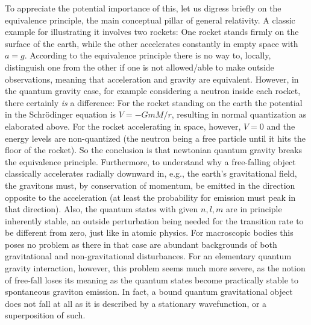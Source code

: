 	To appreciate the potential importance of this, let us digress
	briefly on the equivalence principle, the main conceptual pillar
	of general relativity. A classic example for illustrating it
	involves two rockets: One rocket stands firmly on the surface of
	the earth, while the other accelerates constantly in empty space
	with $a = g$. According to the equivalence principle there is no
	way to, locally, distinguish one from the other if one is not
	allowed/able to make outside observations, meaning that
	acceleration and gravity are equivalent. However, in the quantum
	gravity case, for example considering a neutron inside each
	rocket, there certainly \textit{is} a difference: For the rocket
	standing on the earth the potential in the Schr\"{o}dinger
	equation is $V = -GmM/r$, resulting in normal quantization as
	elaborated above. For the rocket accelerating in space, however,
	$V = 0$ and the energy levels are non-quantized (the neutron being
	a free particle until it hits the floor of the rocket). So the
	conclusion is that newtonian quantum gravity breaks the
	equivalence principle. Furthermore, to understand why a
	free-falling object classically accelerates radially downward in,
	e.g., the earth's gravitational field, the gravitons must, by
	conservation of momentum, be emitted in the direction opposite to
	the acceleration (at least the probability for emission must peak
	in that direction). Also, the quantum states with given $n,l,m$
	are in principle inherently stable, an outside perturbation being
	needed for the transition rate to be different from zero, just
	like in atomic physics. For macroscopic bodies this poses no
	problem as there in that case are abundant backgrounds of both
	gravitational and non-gravitational disturbances. For an
	elementary quantum gravity interaction, however, this problem
	seems much more severe, as the notion of free-fall loses its
	meaning as the quantum states become practically stable to
	spontaneous graviton emission. In fact, a bound quantum
	gravitational object does not fall at all as it is described by a
	stationary wavefunction, or a superposition of such.
	
